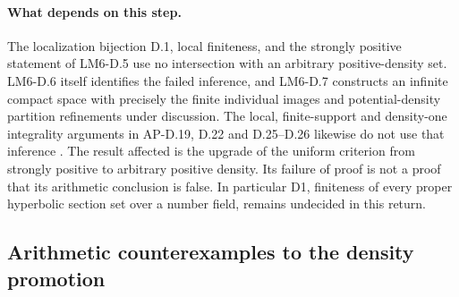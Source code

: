 \paragraph{What depends on this step.}
The localization bijection D.1, local finiteness, and the
strongly positive statement of LM6-D.5 use no intersection with
an arbitrary positive-density set. LM6-D.6 itself identifies
the failed inference, and LM6-D.7 constructs an infinite compact
space with precisely the finite individual images and
potential-density partition refinements under discussion. The
local, finite-support and density-one integrality arguments in
AP-D.19, D.22 and D.25--D.26 likewise do not use that inference
\cite[D.5--D.7]{AgentLM6}\cite[D.19, D.22, D.25--D.26]{AgentAP}.
The result affected is the upgrade of the uniform criterion
from strongly positive to arbitrary positive density. Its
failure of proof is not a proof that its arithmetic conclusion
is false. In particular D1, finiteness of every proper
hyperbolic section set over a number field, remains undecided
in this return.

\subsection{Arithmetic counterexamples to the density promotion}

